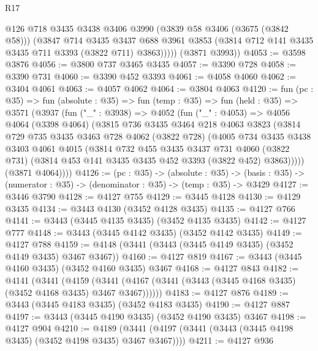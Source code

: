 \begin{lexlean}{R17}
\begin{coremodule}
            @126
            @718
            @3435
            @3438
            @3406
            @3990
            (@3839 @58 @3406 (@3675 (@3842 @58)))
            (@3847
              @714
              @3435
              @3437
              @688
              @3961
              @3853
              (@3814 @712 @141 @3435 @3435 @711 @3393 (@3822 @711) @3863)))))
      (@3871 @3993))
@4053 := @3598 @3876
@4056 := @3800 @737 @3465 @3435
@4057 := @3390 @728
@4058 := @3390 @731
@4060 := @3390 @452 @3393
@4061 := @4058 @4060
@4062 := @3404 @4061
@4063 := @4057 @4062
@4064 := @3804 @4063
@4120 := fun (pc : @35) =>
  fun (absolute : @35) =>
  fun (temp : @35) =>
  fun (held : @35) =>
  @3571
    (@3937
      (fun ("_" : @3938) =>
      @4052
        (fun ("_" : @4053) =>
        @4056
          @4064
          (@3398 @4064)
          (@3815
            @736
            @3435
            @3464
            @218
            @4063
            @3823
            (@3814
              @729
              @735
              @3435
              @3463
              @728
              @4062
              (@3822 @728)
              (@4005
                @734
                @3435
                @3438
                @3403
                @4061
                @4015
                (@3814
                  @732
                  @455
                  @3435
                  @3437
                  @731
                  @4060
                  (@3822 @731)
                  (@3814 @453 @141 @3435 @3435 @452 @3393 (@3822 @452) @3863)))))
          (@3871 @4064))))
@4126 := (pc : @35) ->
  (absolute : @35) ->
  (basis : @35) -> (numerator : @35) -> (denominator : @35) -> (temp : @35) -> @3429
@4127 := @3446 @3790
@4128 := @4127 @755
@4129 := @3445 @4128
@4130 := @4129 @3435
@4134 := @3443 @4130 (@3452 @4128 @3435)
@4135 := @4127 @766
@4141 := @3443 (@3445 @4135 @3435) (@3452 @4135 @3435)
@4142 := @4127 @777
@4148 := @3443 (@3445 @4142 @3435) (@3452 @4142 @3435)
@4149 := @4127 @788
@4159 := @4148 (@3441 (@3443 (@3445 @4149 @3435) (@3452 @4149 @3435) @3467 @3467))
@4160 := @4127 @819
@4167 := @3443 (@3445 @4160 @3435) (@3452 @4160 @3435) @3467
@4168 := @4127 @843
@4182 := @4141
    (@3441
      (@4159 (@3441 (@4167 (@3441 (@3443 (@3445 @4168 @3435) (@3452 @4168 @3435) @3467 @3467))))))
@4183 := @4127 @876
@4189 := @3443 (@3445 @4183 @3435) (@3452 @4183 @3435)
@4190 := @4127 @887
@4197 := @3443 (@3445 @4190 @3435) (@3452 @4190 @3435) @3467
@4198 := @4127 @904
@4210 := @4189 (@3441 (@4197 (@3441 (@3443 (@3445 @4198 @3435) (@3452 @4198 @3435) @3467 @3467))))
@4211 := @4127 @936

\end{coremodule}
\end{lexlean}
